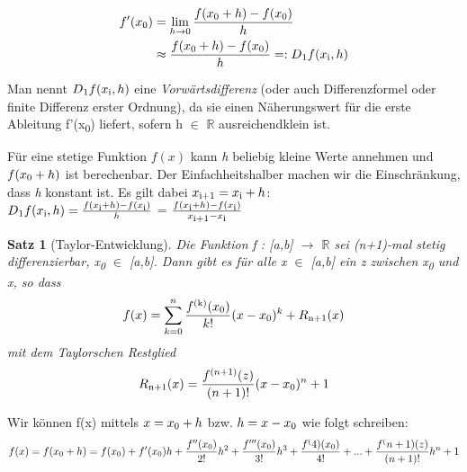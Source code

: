 \documentclass{article}
\theoremstyle{satz}
\newtheorem*{satz}{Satz}
\theoremstyle{definition}
\begin{document}
\begin{equation} \label{eq1}
\begin{split}
f'(x\textsubscript{0}) & = \lim_{h \to 0} \frac{f(x\textsubscript{0} + h) - f(x\textsubscript{0})}{h} \\
 & \approx \frac{f(x\textsubscript{0} + h) - f(x\textsubscript{0})}{h} =: D\textsubscript{1}f(x\textsubscript{i},h)
\end{split}
\end{equation}

Man nennt $D\textsubscript{1}f(x\textsubscript{i},h)$ eine \textit{Vorwärtsdifferenz} (oder auch Differenzformel oder finite Differenz erster Ordnung), da sie einen Näherungswert für die erste Ableitung f'(x\textsubscript{0}) liefert, sofern h $\in$ $\mathbb{R}$ \dq ausreichend\dq  klein ist. 

Für eine stetige Funktion $f(x)$ kann \textit{h} beliebig kleine Werte annehmen und $f(x\textsubscript{0}+h)$ ist berechenbar. Der Einfachheitshalber machen wir die Einschränkung, dass \textit{h} konstant ist. Es gilt dabei $x\textsubscript{i+1} = x\textsubscript{i}+h$:\\
$D\textsubscript{1}f(x\textsubscript{i},h)= \frac{f(x\textsubscript{i} + h)-f(x\textsubscript{i})}{h}$ = $\frac{f(x\textsubscript{i} + h)-f(x\textsubscript{i})}{x\textsubscript{i+1}-x\textsubscript{i}}$

\theoremstyle{satz}
\begin{tcolorbox}

\begin{satz}[Taylor-Entwicklung]
Die Funktion f : [a,b] $\rightarrow$ $\mathbb{R}$ sei (n+1)-mal stetig differenzierbar, x\textsubscript{0} $\in$ [a,b]. Dann gibt es für alle x $\in$ [a,b] ein z zwischen x\textsubscript{0} und x, so dass
\begin{equation}
f(x) =  \sum\limits_{k=0}^{n} \frac{f\textsuperscript{(k)}(x\textsubscript{0})}{k!}(x-x\textsubscript{0})^k + R\textsubscript{n+1}(x) \\
\end{equation}
mit dem Taylorschen Restglied
\begin{equation}
R\textsubscript{n+1}(x) = \frac{f^{(n+1)}(z)}{(n+1)!}(x-x\textsubscript{0})^n+1
\end{equation}
\end{satz}
\end{tcolorbox}
Wir können f(x) mittels $x = x\textsubscript{0} + h$ bzw. $h = x - x\textsubscript{0}$ wie folgt schreiben:
\begin{equation}
f(x) = f(x\textsubscript{0}+h) = f(x\textsubscript{0})+f'(x\textsubscript{0})h + \frac{f''(x\textsubscript{0})}{2!}h^2+\frac{f'''(x\textsubscript{0})}{3!}h^3+\frac{f^(4)(x\textsubscript{0})}{4!}+...+\frac{f^(n+1)(z)}{(n+1)!}h^n+1
\end{equation}
\end{document}
